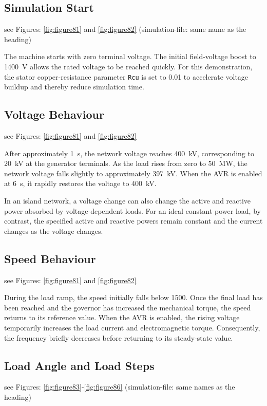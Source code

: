 \subsection{Simulation Start} see Figures: \ref{fig:figure81} and \ref{fig:figure82}  (simulation-file: same name as the heading)

The machine starts with zero terminal voltage. The initial field-voltage boost
to \SI{1400}{\volt} allows the rated voltage to be reached quickly. For this
demonstration, the stator copper-resistance parameter \texttt{Rcu} is set to
\num{0.01} to accelerate voltage buildup and thereby reduce simulation time.

\subsection{Voltage Behaviour} see Figures: \ref{fig:figure81} and \ref{fig:figure82}

After approximately \SI{1}{\second}, the network voltage reaches
\SI{400}{\kilo\volt}, corresponding to \SI{20}{\kilo\volt} at the
generator terminals. As the load rises from zero to
\SI{50}{\mega\watt}, the network voltage falls slightly to approximately
\SI{397}{\kilo\volt}. When the AVR is enabled at \SI{6}{\second}, it
rapidly restores the voltage to \SI{400}{\kilo\volt}.

In an island network, a voltage change can also change the active and reactive
power absorbed by voltage-dependent loads. For an ideal constant-power load,
by contrast, the specified active and reactive powers remain constant and the
current changes as the voltage changes.

\subsection{Speed Behaviour} see Figures: \ref{fig:figure81} and \ref{fig:figure82}

During the load ramp, the speed initially falls below \SI{1500}{\rpm}. Once
the final load has been reached and the governor has increased the mechanical
torque, the speed returns to its reference value. When the AVR is enabled, the
rising voltage temporarily increases the load current and electromagnetic
torque. Consequently, the frequency briefly decreases before returning to its
steady-state value.

\subsection{Load Angle and Load Steps} see Figures: \ref{fig:figure83}-\ref{fig:figure86}  (simulation-file: same names as the heading)

